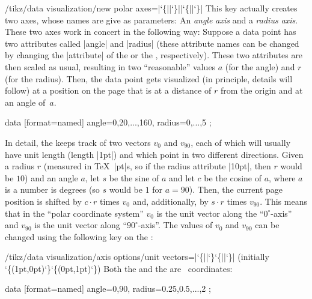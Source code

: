 \begin{key}{/tikz/data visualization/new polar axes=|\char`\{||\char`\}||\char`\{||\char`\}|}
  This key actually creates two axes, whose names are give as
  parameters: An
  \emph{angle axis} and a \emph{radius axis}. These two axes work in
  concert in the following way: Suppose a data point has two
  attributes called |angle| and |radius| (these attribute names can be
  changed by changing the |attribute| of the  or
  the , respectively). These two attributes are
  then scaled as usual, resulting in two ``reasonable'' values $a$
  (for the angle) and $r$ (for the radius). Then, the data point gets
  visualized (in principle, details will follow) at a position on the
  page that is at a distance of $r$ from the origin and at an angle
  of~$a$.  
\begin{codeexample}[]
\tikz \datavisualization
    [new polar axes={angle axis}{radius axis},
     radius axis={length=2cm},
     visualize as scatter]
  data [format=named] {
    angle={0,20,...,160}, radius={0,...,5}
  };
\end{codeexample}
  In detail, the  keeps track of two vectors $v_0$
  and $v_{90}$, each of which will usually have unit length (length
  |1pt|) and which point in two different directions. Given a radius
  $r$ (measured in \TeX\ |pt|s, so if the 
  radius attribute |10pt|, then $r$ would be $10$) and an angle $a$,
  let $s$ be the sine of $a$ and let $c$ be the cosine
  of $a$, where $a$ is a number is degrees (so $s$
  would be $1$ for $a = 90$). Then, the current page position is
  shifted by $c \cdot r$ times $v_0$ and, additionally, by $s \cdot r$
  times $v_{90}$. This means that in the
  ``polar coordinate system'' $v_0$ is the unit vector along the
  ``$0^\circ$-axis'' and $v_{90}$ is the unit vector along
  ``$90^\circ$-axis''. The values of $v_0$ and $v_{90}$ can be changed
  using the following key on the :
  \begin{key}{/tikz/data visualization/axis options/unit
      vectors=|\char`\{||\char`\}\char`\{||\char`\}| (initially {\char`\{(1pt,0pt)\char`\}\char`\{(0pt,1pt)\char`\}})}
    Both the  and the  are \tikzname\ coordinates:
\begin{codeexample}[]
\tikz \datavisualization
    [new polar axes={angle axis}{radius axis},
     radius axis={unit length=1cm},
     angle axis={unit vectors={(10:1pt)}{(60:1pt)}},
     visualize as scatter]
  data [format=named] {
    angle={0,90}, radius={0.25,0.5,...,2}
  };
\end{codeexample}    
  \end{key}
\end{key}


